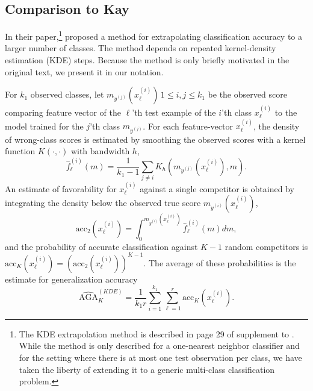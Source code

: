 \documentclass[twoside,11pt]{article}
\begin{document}
\subsection{Comparison to Kay}

\label{sec:KDEcomparison}
In their paper,\footnote{The KDE extrapolation method is described in page 29 of supplement to \cite{Kay2008a}.  While the method is only described for
a one-nearest neighbor classifier and for the setting where there is at most
one test observation per class, we have taken the liberty of extending it to a generic multi-class classification problem.}
\cite{Kay2008a} proposed a method for extrapolating classification
accuracy to a larger number of classes. The method depends on repeated
kernel-density estimation (KDE) steps. Because the method is only
briefly motivated in the original text, we present it in our
notation. 

For $k_1$ observed classes, let $m_{y^{(j)}}(x^{(i)}_\ell)\, 1\leq i,j\leq k_1$ be
the observed score comparing feature vector of the $\ell$'th test example of the $i$'th class $x^{(i)}_\ell$
to the model trained for the $j$'th class $m_{y^{(j)}}$. 
For each feature-vector $x^{(i)}_\ell$, the density of wrong-class scores is estimated by smoothing the observed scores
with a kernel function $K(\cdot,\cdot)$ with bandwidth $h$,
\[\hat{f}_\ell^{(i)}(m) = \frac{1}{k_1-1} \sum_{j\neq i} K_h(m_{y^{(j)}}(x^{(i)}_\ell), m).\]
An estimate of favorability for $x^{(i)}_\ell$ against a
single competitor is obtained by integrating the density below the observed true score $m_{y^{(i)}}(x^{(i)}_\ell)$, 
\[\mathrm{acc}_2(x_\ell^{(i)}) = \int_{0}^{m_{y^{(i)}}(x^{(i)}_\ell)} \hat{f}_\ell^{(i)}(m)dm,\]
and the probability of accurate classification against $K-1$ random
competitors is $\mathrm{acc}_{K}(x^{(i)}_\ell) = (\mathrm{acc}_2(x^{(i)}_\ell))^{K-1}$. The average of these probabilities is the estimate for generalization accuracy
\[\mathrm{\hat{AGA}}_{K}^{(KDE)} = \frac{1}{k_1 r} \sum_{i=1}^{k_1} \sum_{\ell=1}^{r} \mathrm{acc}_{K}(x^{(i)}_\ell).\]
\end{document}

